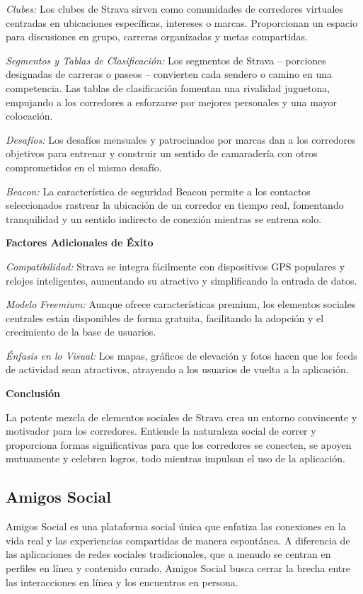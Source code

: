 \textit{Clubes:} Los clubes de Strava sirven como comunidades de corredores virtuales centradas en ubicaciones específicas, intereses o marcas. Proporcionan un espacio para discusiones en grupo, carreras organizadas y metas compartidas.

\textit{Segmentos y Tablas de Clasificación:} Los segmentos de Strava – porciones designadas de carreras o paseos – convierten cada sendero o camino en una competencia. Las tablas de clasificación fomentan una rivalidad juguetona, empujando a los corredores a esforzarse por mejores personales y una mayor colocación.

\textit{Desafíos:} Los desafíos mensuales y patrocinados por marcas dan a los corredores objetivos para entrenar y construir un sentido de camaradería con otros comprometidos en el mismo desafío.

\textit{Beacon:} La característica de seguridad Beacon permite a los contactos seleccionados rastrear la ubicación de un corredor en tiempo real, fomentando tranquilidad y un sentido indirecto de conexión mientras se entrena solo.

\textbf{Factores Adicionales de Éxito}

\textit{Compatibilidad:} Strava se integra fácilmente con dispositivos GPS populares y relojes inteligentes, aumentando su atractivo y simplificando la entrada de datos.

\textit{Modelo Freemium:} Aunque ofrece características premium, los elementos sociales centrales están disponibles de forma gratuita, facilitando la adopción y el crecimiento de la base de usuarios.

\textit{Énfasis en lo Visual:} Los mapas, gráficos de elevación y fotos hacen que los feeds de actividad sean atractivos, atrayendo a los usuarios de vuelta a la aplicación.

\textbf{Conclusión}

La potente mezcla de elementos sociales de Strava crea un entorno convincente y motivador para los corredores. Entiende la naturaleza social de correr y proporciona formas significativas para que los corredores se conecten, se apoyen mutuamente y celebren logros, todo mientras impulsan el uso de la aplicación.




\subsection{Amigos Social}
Amigos Social es una plataforma social única que enfatiza las conexiones en la vida real y las experiencias compartidas de manera espontánea. A diferencia de las aplicaciones de redes sociales tradicionales, que a menudo se centran en perfiles en línea y contenido curado, Amigos Social busca cerrar la brecha entre las interacciones en línea y los encuentros en persona.

